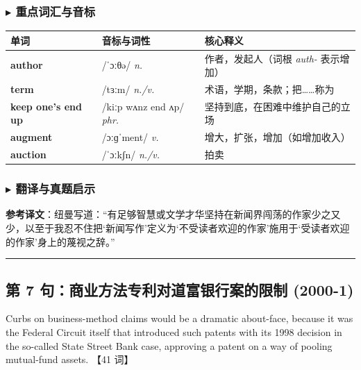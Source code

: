 \documentclass[cn,normal,11pt]{elegantnote}
\newcommand{\retrokey}[1]{{\color{accentcolor}\textbf{#1}}}
\renewcommand{\citshape}{\kaishu\fontspec{Arial}}
\begin{document}
\subsubsection*{$\blacktriangleright$ 重点词汇与音标}
\noindent
\begin{tabularx}{\textwidth}{l X p{7cm}}
  \toprule
  \textbf{单词} & \textbf{音标与词性} & \textbf{核心释义} \\
  \midrule
  \retrokey{author} & {\citshape /ˈɔːθə/} \textit{n.} & 作者，发起人（词根 \textit{auth-} 表示增加） \\
  \midrule
  \retrokey{term} & {\citshape /tɜːm/} \textit{n./v.} & 术语，学期，条款；把……称为 \\
  \midrule
  \retrokey{keep one's end up} & {\citshape /kiːp wʌnz end ʌp/} \textit{phr.} & 坚持到底，在困难中维护自己的立场 \\
  \midrule
  \retrokey{augment} & {\citshape /ɔːɡˈment/} \textit{v.} & 增大，扩张，增加（如增加收入） \\
  \midrule
  \retrokey{auction} & {\citshape /ˈɔːkʃn/} \textit{n./v.} & 拍卖 \\
  \bottomrule
\end{tabularx}

\subsubsection*{$\blacktriangleright$ 翻译与真题启示}
\begin{remark}
  \textbf{参考译文}：纽曼写道：“有足够智慧或文学才华坚持在新闻界闯荡的作家少之又少，以至于我忍不住把‘新闻写作’定义为‘不受读者欢迎的作家’施用于‘受读者欢迎的作家’身上的蔑视之辞。”
\end{remark}

\par\vspace{10pt}\hrule\vspace{10pt}

\subsection{第 7 句：商业方法专利对道富银行案的限制 (2000-1)}

\begin{note}
  Curbs on business-method claims would be a dramatic about-face, because it was the Federal Circuit itself that introduced such patents with its 1998 decision in the so-called State Street Bank case, approving a patent on a way of pooling mutual-fund assets. 【41 词】
\end{note}
\end{document}
